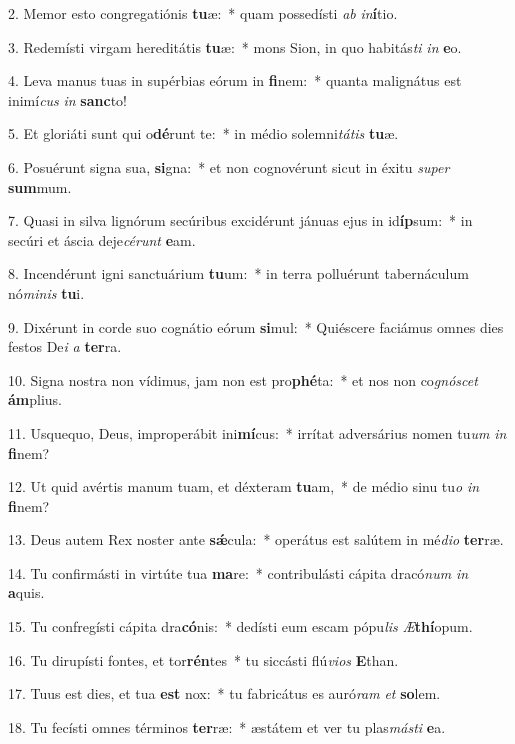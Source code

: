 2. Memor esto congregatiónis \textbf{tu}æ:~*  quam possedísti \textit{ab} \textit{in}\textbf{í}tio.\

3. Redemísti virgam hereditátis \textbf{tu}æ:~*  mons Sion, in quo habitás\textit{ti} \textit{in} \textbf{e}o.\

4. Leva manus tuas in supérbias eórum in \textbf{fi}nem:~*  quanta malignátus est inimí\textit{cus} \textit{in} \textbf{sanc}to!\

5. Et gloriáti sunt qui o\textbf{dé}runt te:~*  in médio solemni\textit{tá}\textit{tis} \textbf{tu}æ.\

6. Posuérunt signa sua, \textbf{si}gna:~*  et non cognovérunt sicut in éxitu \textit{su}\textit{per} \textbf{sum}mum.\

7. Quasi in silva lignórum secúribus excidérunt jánuas ejus in id\textbf{íp}sum:~*  in secúri et áscia deje\textit{cé}\textit{runt} \textbf{e}am.\

8. Incendérunt igni sanctuárium \textbf{tu}um:~*  in terra polluérunt tabernáculum nó\textit{mi}\textit{nis} \textbf{tu}i.\

9. Dixérunt in corde suo cognátio eórum \textbf{si}mul:~*  Quiéscere faciámus omnes dies festos De\textit{i} \textit{a} \textbf{ter}ra.\

10. Signa nostra non vídimus, jam non est pro\textbf{phé}ta:~*  et nos non co\textit{gnó}\textit{scet} \textbf{ám}plius.\

11. Usquequo, Deus, improperábit ini\textbf{mí}cus:~*  irrítat adversárius nomen tu\textit{um} \textit{in} \textbf{fi}nem?\

12. Ut quid avértis manum tuam, et déxteram \textbf{tu}am,~*  de médio sinu tu\textit{o} \textit{in} \textbf{fi}nem?\

13. Deus autem Rex noster ante \textbf{sǽ}cula:~*  operátus est salútem in mé\textit{di}\textit{o} \textbf{ter}ræ.\

14. Tu confirmásti in virtúte tua \textbf{ma}re:~*  contribulásti cápita dracó\textit{num} \textit{in} \textbf{a}quis.\

15. Tu confregísti cápita dra\textbf{có}nis:~*  dedísti eum escam pópu\textit{lis} \textit{Æ}\textbf{thí}opum.\

16. Tu dirupísti fontes, et tor\textbf{rén}tes~*  tu siccásti flú\textit{vi}\textit{os} \textbf{E}than.\

17. Tuus est dies, et tua \textbf{est} nox:~*  tu fabricátus es auró\textit{ram} \textit{et} \textbf{so}lem.\

18. Tu fecísti omnes términos \textbf{ter}ræ:~*  æstátem et ver tu plas\textit{más}\textit{ti} \textbf{e}a.\

